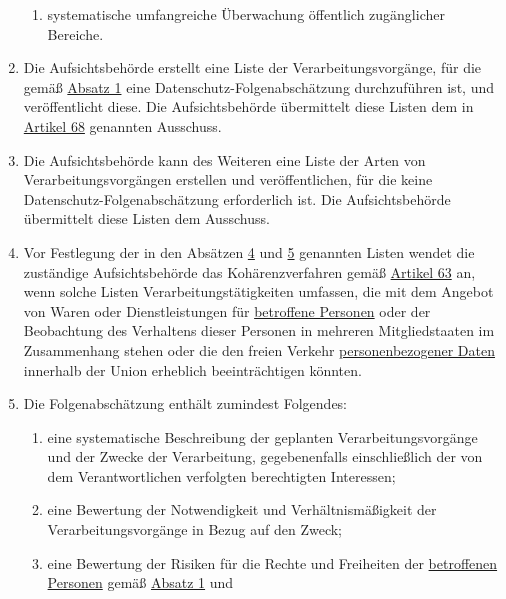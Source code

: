 \begin{enumerate}
\begin{enumerate}
    \item systematische umfangreiche Überwachung öffentlich zugänglicher Bereiche.
    \label{itm:35-3c}

  \end{enumerate}

  \item Die Aufsichtsbehörde erstellt eine Liste der Verarbeitungsvorgänge, für die gemäß \hyperref[itm:35-1]{Absatz 1}
   eine Datenschutz-Folgenabschätzung durchzuführen ist, und veröffentlicht diese. Die Aufsichtsbehörde übermittelt
   diese Listen dem in \hyperref[ch:68]{Artikel 68} genannten Ausschuss.
  \label{itm:35-4}

  \item Die Aufsichtsbehörde kann des Weiteren eine Liste der Arten von Verarbeitungsvorgängen erstellen und
   veröffentlichen, für die keine Datenschutz-Folgenabschätzung erforderlich ist. Die Aufsichtsbehörde übermittelt
   diese Listen dem Ausschuss.
  \label{itm:35-5}

  \item Vor Festlegung der in den Absätzen \hyperref[itm:35-4]{4} und \hyperref[itm:35-5]{5} genannten Listen wendet die
   zuständige Aufsichtsbehörde das Kohärenzverfahren gemäß \hyperref[ch:63]{Artikel 63} an, wenn solche Listen
   Verarbeitungstätigkeiten umfassen, die mit dem Angebot von Waren oder Dienstleistungen für \hyperref[itm:04-1]{betroffene Personen} oder
   der Beobachtung des Verhaltens dieser Personen in mehreren Mitgliedstaaten im Zusammenhang stehen oder die den
   freien Verkehr \hyperref[itm:04-1]{personenbezogener Daten} innerhalb der Union erheblich beeinträchtigen könnten.
  \label{itm:35-6}

  \item Die Folgenabschätzung enthält zumindest Folgendes:
  \label{itm:35-7}

  \begin{enumerate}
  
    \item eine systematische Beschreibung der geplanten Verarbeitungsvorgänge und der Zwecke der Verarbeitung,
     gegebenenfalls einschließlich der von dem Verantwortlichen verfolgten berechtigten Interessen;
    \label{itm:35-7a}

    \item eine Bewertung der Notwendigkeit und Verhältnismäßigkeit der Verarbeitungsvorgänge in Bezug auf den Zweck;
    \label{itm:35-7b}

    \item eine Bewertung der Risiken für die Rechte und Freiheiten der \hyperref[itm:04-1]{betroffenen Personen} gemäß \hyperref[itm:35-1]
     {Absatz 1} und
    \label{itm:35-7c}


\end{enumerate}
\end{enumerate}
